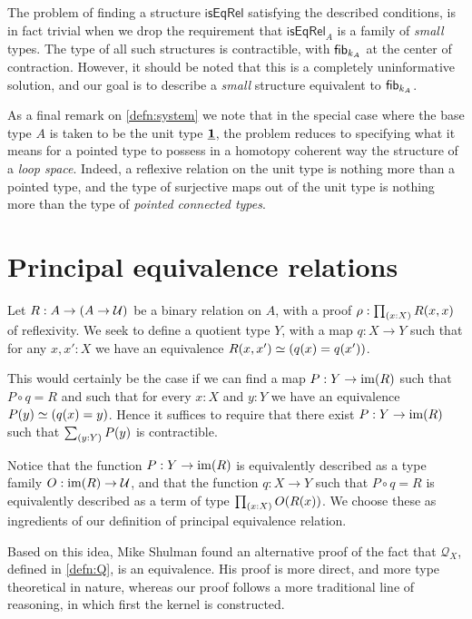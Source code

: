 The problem of finding a structure $\mathsf{isEqRel}$ satisfying the described conditions, is in fact trivial when we drop the requirement that $\mathsf{isEqRel}_A$ is a family of \emph{small} types. The type of all such structures is contractible, with $\mathsf{fib}_{k_A}$ at the center of contraction. However, it should be noted that this is a completely uninformative solution, and our goal is to describe a \emph{small} structure equivalent to $\mathsf{fib}_{k_A}$.

As a final remark on \autoref{defn:system} we note that in the special case where the base type $A$ is taken to be the unit type $\underline{\mathbf{1}}$, the problem reduces to specifying what it means for a pointed type to possess in a homotopy coherent way the structure of a \emph{loop space}. Indeed, a reflexive relation on the unit type is nothing more than a pointed type, and the type of surjective maps out of the unit type is nothing more than the type of \emph{pointed connected types}.

\section{Principal equivalence relations}

Let $R: A\to (A\to\mathcal{U})$ be a binary relation on $A$, with a proof $\rho:\prd{x:X}R(x,x)$ of reflexivity. We seek to define a quotient type $Y$, with a map $q : X\to Y$ such that for any $x,x':X$ we have an equivalence $\eqv{R(x,x')}{(q(x)=q(x'))}$. 

This would certainly be the case if we can find a map $P:Y\to\operatorname{im}(R)$ such that $P\circ q=R$ and such that for every $x:X$ and $y:Y$ we have an equivalence $\eqv{P(y)}{(q(x)=y)}$. Hence it suffices to require that there exist $P:Y\to\operatorname{im}(R)$ such that $\sm{y:Y}P(y)$ is contractible. 

Notice that the function $P:Y\to\operatorname{im}(R)$ is equivalently described as a type family $O:\operatorname{im}(R)\to\mathcal{U}$, and that the function $q:X\to Y$ such that $P\circ q=R$ is equivalently described as a term of type $\prd{x:X} O(R(x))$. We choose these as ingredients of our definition of principal equivalence relation.

Based on this idea, Mike Shulman found an alternative proof of the fact that $\mathcal{Q}_X$, defined in \autoref{defn:Q}, is an equivalence. His proof is more direct, and more type theoretical in nature, whereas our proof follows a more traditional line of reasoning, in which first the kernel is constructed.

